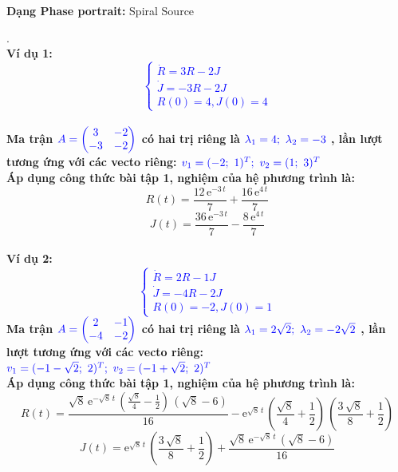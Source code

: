 \textbf{Dạng Phase portrait: } Spiral Source
\pagebreak
\begin{tcbdoublebox}[title={9. Narcissistic Nerd and Hermit}]
\mdseries .\\
\bfseries Ví dụ 1: \\
\textcolor{blue}{$$\left\{\begin{matrix}
\dot{R} =  3R -2J \\ 
\dot{J} =  -3R-2J\\ 
R(0)= 4, J(0)=4
\end{matrix}\right.$$}\\
\mdseries Ma trận $\color{blue}A=\begin{pmatrix}
3 & -2\\ 
-3 & -2
\end{pmatrix}$ có hai trị riêng là 
$\color{blue}\lambda_{1}=4;\ \lambda_{2}=-3$
, lần lượt tương ứng với các vecto riêng:
$\color{blue}v_{1} = (-2;\ 1)^{T};\ v_{2}=(1;\ 3)^{T}$\\Áp dụng công thức bài tập 1, nghiệm của hệ phương trình là:
$$R(t)=\frac{12\,{\mathrm{e}}^{-3\,t}}{7}+\frac{16\,{\mathrm{e}}^{4\,t}}{7}$$
$$J(t)=\frac{36\,{\mathrm{e}}^{-3\,t}}{7}-\frac{8\,{\mathrm{e}}^{4\,t}}{7}$$
\\
\bfseries Ví dụ 2:\\
\textcolor{blue}{$$\left\{\begin{matrix}
\dot{R} = 2R -1J \\ 
\dot{J} =  -4R -2J\\ 
R(0)= -2, J(0)=1
\end{matrix}\right.$$}
\mdseries Ma trận $\color{blue}A=\begin{pmatrix}
2 & -1\\ 
-4 & -2
\end{pmatrix}$ có hai trị riêng là 
$\color{blue}\lambda_{1}=2\sqrt{2};\ \lambda_{2}=-2\sqrt{2}$
, lần lượt tương ứng với các vecto riêng:
$\color{blue}v_{1} = (-1-\sqrt{2};\ 2)^{T};\ v_{2}=(-1+\sqrt{2};\ 2)^{T}$\\Áp dụng công thức bài tập 1, nghiệm của hệ phương trình là:
$$R(t)=\frac{\sqrt{8}\,{\mathrm{e}}^{-\sqrt{8}\,t}\,\left(\frac{\sqrt{8}}{4}-\frac{1}{2}\right)\,\left(\sqrt{8}-6\right)}{16}-{\mathrm{e}}^{\sqrt{8}\,t}\,\left(\frac{\sqrt{8}}{4}+\frac{1}{2}\right)\,\left(\frac{3\,\sqrt{8}}{8}+\frac{1}{2}\right)$$
$$J(t)={\mathrm{e}}^{\sqrt{8}\,t}\,\left(\frac{3\,\sqrt{8}}{8}+\frac{1}{2}\right)+\frac{\sqrt{8}\,{\mathrm{e}}^{-\sqrt{8}\,t}\,\left(\sqrt{8}-6\right)}{16}$$

\end{tcbdoublebox}
